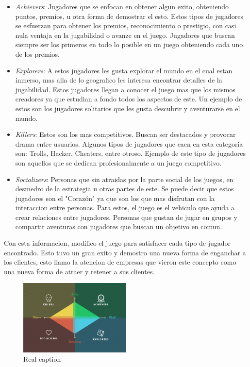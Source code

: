 \begin{itemize}

\item \emph{Achievers}: Jugadores que se enfocan en obtener algun exito, obteniendo puntos, premios,
 u otra forma de demostrar el esto. Estos tipos de jugadores se esfuerzan para obtener los premios,
reconocimiento o prestigio, con casi nula ventaja en la jugabilidad o avanze en el juego. Jugadores que
buscan siempre ser los primeros en todo lo posible en un juego obteniendo cada uno de los premios. 

\item \emph{Explorers}: A estos jugadores les gusta explorar el mundo en el cual estan inmerso, mas alla
de lo geografico les interesa encontrar detalles de la jugabilidad. Estos jugadores llegan a conocer
el juego mas que los mismos creadores ya que estudian a fondo todos los aspectos de este. Un
ejemplo de estos son los jugadores solitarios que les gusta descubrir y aventurarse en el mundo.

\item \emph{Killers}: Estos son los mas competitivos. Buscan ser destacados y provocar drama entre usuarios.
Algunos tipos de jugadores que caen en esta categoria son: Trolls, Hacker, Cheaters, entre otroso. Ejemplo 
de este tipo de jugadores son aquellos que se dedican profesionalmente a un juego competitivo.

\item \emph{Socializers}: Personas que sin atraidas por la parte social de los juegos, en desmedro de
la estrategia u otras partes de este. Se puede decir que estos jugadores son el "Corazón" ya que
son los que mas disfrutan con la interaccion entre personas. Para estos, el juego es el vehiculo
que ayuda a crear relaciones entre jugadores. Personas que gustan de jugar en grupos y compartir 
aventuras con jugadores que buscan un objetivo en comun. 

\end{itemize}


Con esta informacion, modifico el juego para satisfacer cada tipo de jugador encontrado. Esto tuvo un 
gran exito y demostro una nueva forma de enganchar a los clientes, esto llamo la atencion de  
empresas que vieron este concepto como una nueva forma de atraer y retener a sus clientes.

\begin{figure}[!htb]
  \centering
  \includegraphics[width=0.5\textwidth]{images/TypeOfPlayersBartle.png}
  \caption[Caption for LOF]{Real caption\footnotemark}
  \label{fig:Players}
\end{figure}

